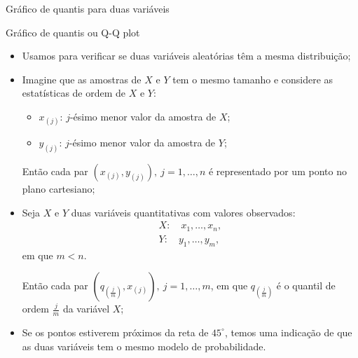 \documentclass[10pt]{beamer}
\begin{document}
\begin{frame}{Gráfico de quantis para duas variáveis}

\footnotesize
\begin{block}{Gráfico de quantis ou Q-Q plot}
	\begin{itemize}
		\item Usamos para verificar se duas variáveis aleatórias têm a mesma distribuição;
		\item Imagine que as amostras de $X$ e $Y$ tem o mesmo tamanho e considere as estatísticas de ordem de $X$ e $Y$:
		\begin{itemize}
			\item $x_{(j)}$: $j$-ésimo menor valor da amostra de $X$;
			\item $y_{(j)}$: $j$-ésimo menor valor da amostra de $Y$;
		\end{itemize}
		Então cada par $(x_{(j)}, y_{(j)}), \ j=1, \dots, n$ é representado por um ponto no plano cartesiano;
		\item Seja $X$ e $Y$ duas variáveis quantitativas com valores observados:
		\begin{align*}
			X:\quad x_1, \dots, x_n,\\
			Y:\quad y_1, \dots, y_m,
		\end{align*}
		em que $m < n$. 
		
		Então cada par $(q_{\left( \frac{j}{m}\right)}, x_{(j)}),\ j=1, \dots, m$, em que $q_{\left( \frac{j}{m}\right)}$ é o quantil de ordem $\frac{j}{m}$ da variável $X$;
		
		\item Se os pontos estiverem próximos da reta de $45^\circ$, temos uma indicação de que as duas variáveis tem o mesmo modelo de probabilidade.
	\end{itemize}
\end{block}
\normalsize

\end{frame}
\end{document}
